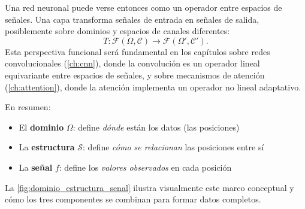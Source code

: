 Una red neuronal puede verse entonces como un operador entre espacios de señales. Una capa transforma señales de entrada en señales de salida, posiblemente sobre dominios y espacios de canales diferentes:
\[
T: \mathcal{F}(\Omega, \mathcal{C}) \to \mathcal{F}(\Omega', \mathcal{C}').
\]
Esta perspectiva funcional será fundamental en los capítulos sobre redes convolucionales (\autoref{ch:cnn}), donde la convolución es un operador lineal equivariante entre espacios de señales, y sobre mecanismos de atención (\autoref{ch:attention}), donde la atención implementa un operador no lineal adaptativo.

En resumen:
\begin{itemize}
	\item El \textbf{dominio} $\Omega$: define \textit{dónde} están los datos (las posiciones)
	\item La \textbf{estructura} $\mathcal{S}$: define \textit{cómo se relacionan} las posiciones entre sí
	\item La \textbf{señal} $f$: define los \textit{valores observados} en cada posición
\end{itemize}

La \autoref{fig:dominio_estructura_senal} ilustra visualmente este marco conceptual y cómo los tres componentes se combinan para formar datos completos.


